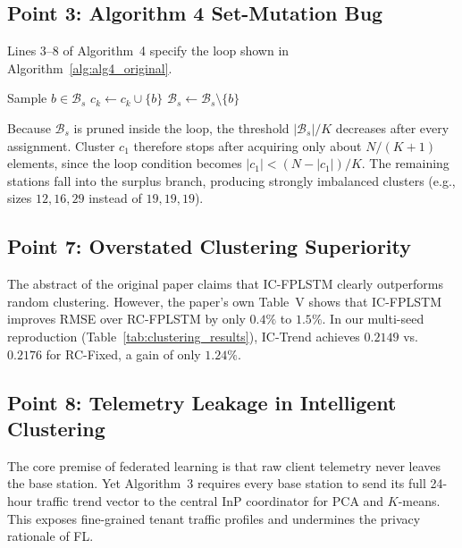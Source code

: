 \documentclass[11pt,a4paper]{article}
\begin{document}
\subsection{Point 3: Algorithm 4 Set-Mutation Bug}
Lines 3--8 of Algorithm~4 specify the loop shown in Algorithm~\ref{alg:alg4_original}.

\begin{algorithm}[htbp]
\caption{Cluster filling loop of the original Algorithm 4 (as specified in the paper)}
\label{alg:alg4_original}
\begin{algorithmic}[1]
    \State Sample $b \in \mathcal{B}_s$
    \State $c_k \leftarrow c_k \cup \{b\}$
    \State $\mathcal{B}_s \leftarrow \mathcal{B}_s \setminus \{b\}$
\EndWhile
\end{algorithmic}
\end{algorithm}

Because $\mathcal{B}_s$ is pruned inside the loop, the threshold $|\mathcal{B}_s|/K$ decreases after every assignment. Cluster $c_1$ therefore stops after acquiring only about $N/(K+1)$ elements, since the loop condition becomes $|c_1| < (N - |c_1|)/K$. The remaining stations fall into the surplus branch, producing strongly imbalanced clusters (e.g., sizes $12, 16, 29$ instead of $19, 19, 19$).

\subsection{Point 7: Overstated Clustering Superiority}
The abstract of the original paper claims that IC-FPLSTM clearly outperforms random clustering. However, the paper's own Table~V shows that IC-FPLSTM improves RMSE over RC-FPLSTM by only $0.4\%$ to $1.5\%$. In our multi-seed reproduction (Table~\ref{tab:clustering_results}), IC-Trend achieves $0.2149$ vs.\ $0.2176$ for RC-Fixed, a gain of only $1.24\%$.

\subsection{Point 8: Telemetry Leakage in Intelligent Clustering}
The core premise of federated learning is that raw client telemetry never leaves the base station. Yet Algorithm~3 requires every base station to send its full 24-hour traffic trend vector to the central InP coordinator for PCA and $K$-means. This exposes fine-grained tenant traffic profiles and undermines the privacy rationale of FL.

\end{document}
